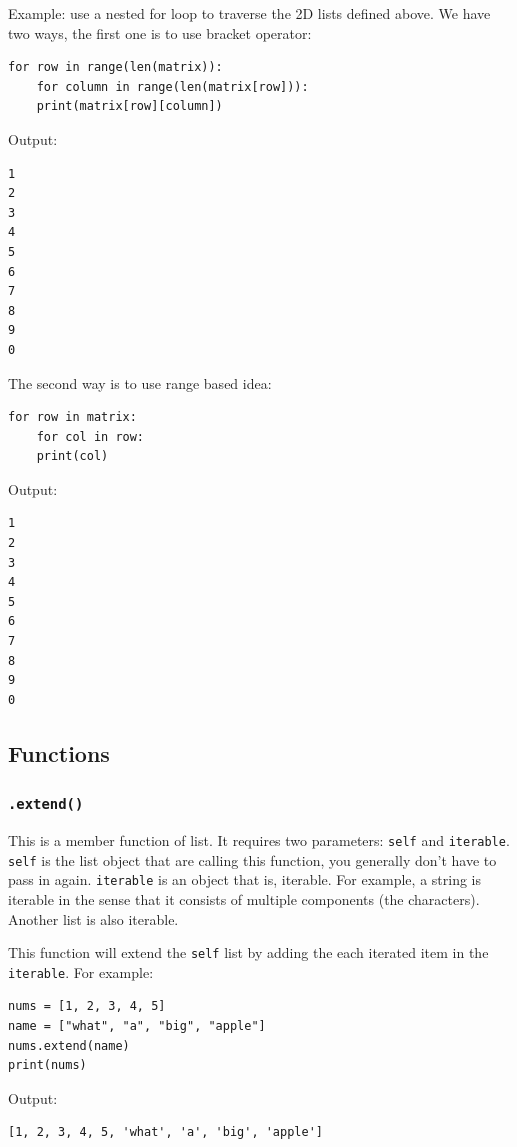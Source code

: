\documentclass[12pt]{book}
\begin{document}
Example: use a nested for loop to traverse the 2D lists defined above. We have two ways, the first one is to use bracket operator:
\begin{verbatim}
for row in range(len(matrix)):
    for column in range(len(matrix[row])):
	print(matrix[row][column])
\end{verbatim}
Output:
\begin{verbatim}
1
2
3
4
5
6
7
8
9
0
\end{verbatim}

The second way is to use range based idea:
\begin{verbatim}
for row in matrix:
    for col in row:
	print(col)
\end{verbatim}
Output:
\begin{verbatim}
1
2
3
4
5
6
7
8
9
0
\end{verbatim}

\subsection{Functions}
\label{sec:org822c95c}
\subsubsection{\texttt{.extend()}}
\label{sec:orgf343562}
This is a member function of list. It requires two parameters: \texttt{self} and \texttt{iterable}. \texttt{self} is the list object that are calling this function, you generally don't have to pass in again. \texttt{iterable} is an object that is, iterable. For example, a string is iterable in the sense that it consists of multiple components (the characters). Another list is also iterable.

This function will extend the \texttt{self} list by adding the each iterated item in the \texttt{iterable}. For example:
\begin{verbatim}
nums = [1, 2, 3, 4, 5]
name = ["what", "a", "big", "apple"]
nums.extend(name)
print(nums)
\end{verbatim}
Output:
\begin{verbatim}
[1, 2, 3, 4, 5, 'what', 'a', 'big', 'apple']
\end{verbatim}
\end{document}
